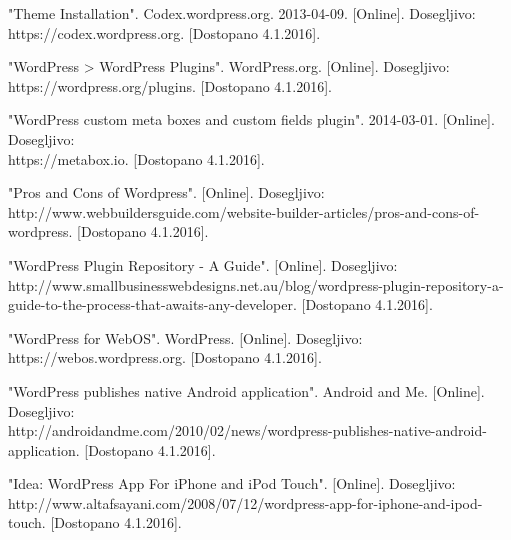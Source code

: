 \documentclass[a4paper, 12pt]{book}
\begin{document}
\begin{thebibliography}{99}
 "Theme Installation". Codex.wordpress.org. 2013-04-09.
[Online]. Dosegljivo:\\ https://codex.wordpress.org.
[Dostopano 4.1.2016].

 "WordPress > WordPress Plugins". WordPress.org.
[Online]. Dosegljivo:\\ https://wordpress.org/plugins.
[Dostopano 4.1.2016].

 "WordPress custom meta boxes and custom fields plugin". 2014-03-01. 
[Online]. Dosegljivo:\\ https://metabox.io.
[Dostopano 4.1.2016].

  "Pros and Cons of Wordpress". 
[Online]. Dosegljivo:\\ http://www.webbuildersguide.com/website-builder-articles/pros-and-cons-of-wordpress.
[Dostopano 4.1.2016].

 "WordPress Plugin Repository - A Guide".
[Online]. Dosegljivo:\\ http://www.smallbusinesswebdesigns.net.au/blog/wordpress-plugin-repository-a-guide-to-the-process-that-awaits-any-developer.
[Dostopano 4.1.2016].

 "WordPress for WebOS". WordPress.
[Online]. Dosegljivo:\\ https://webos.wordpress.org.
[Dostopano 4.1.2016].

 "WordPress publishes native Android application". Android and Me.
[Online]. Dosegljivo:\\ http://androidandme.com/2010/02/news/wordpress-publishes-native-android-application.
[Dostopano 4.1.2016].
 
 "Idea: WordPress App For iPhone and iPod Touch".
[Online]. Dosegljivo:\\ http://www.altafsayani.com/2008/07/12/wordpress-app-for-iphone-and-ipod-touch.
[Dostopano 4.1.2016].






\end{thebibliography}
\end{document}

